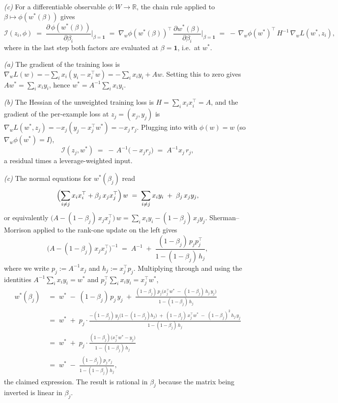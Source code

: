 \documentclass[11pt]{article}
\begin{document}
\begin{solution}[ex:if-derive]
\textit{(c)} For a differentiable observable $\phi:W\to\mathbb{R}$, the chain rule applied to $\beta\mapsto\phi(w^*(\beta))$ gives
\[
  \mathcal{I}(z_i,\phi) \;=\; \frac{\partial\,\phi(w^*(\beta))}{\partial \beta_i}\bigg\rvert_{\beta=\mathbf{1}} \;=\; \nabla_w\phi(w^*(\beta))^\top\,\frac{\partial w^*(\beta)}{\partial \beta_i}\bigg\rvert_{\beta=\mathbf{1}} \;=\; -\,\nabla_w\phi(w^*)^\top\,H^{-1}\,\nabla_w L(w^*,z_i),
\]
where in the last step both factors are evaluated at $\beta = \mathbf{1}$, i.e.\ at $w^*$.

\end{solution}

\begin{solution}[ex:ols-if]

\textit{(a)} The gradient of the training loss is $\nabla_w L(w) = -\sum_i x_i(y_i - x_i^\top w) = -\sum_i x_i y_i + Aw$. Setting this to zero gives $Aw^* = \sum_i x_i y_i$, hence $w^* = A^{-1}\sum_i x_i y_i$.

\textit{(b)} The Hessian of the unweighted training loss is $H = \sum_i x_i x_i^\top = A$, and the gradient of the per-example loss at $z_j = (x_j,y_j)$ is $\nabla_w L(w^*, z_j) = -x_j(y_j - x_j^\top w^*) = -x_j\,r_j$. Plugging into  with $\phi(w) = w$ (so $\nabla_w\phi(w^*) = I$),
\[
  \mathcal{I}(z_j, w^*) \;=\; -\,A^{-1}\bigl(-x_j r_j\bigr) \;=\; A^{-1} x_j\,r_j,
\]
a residual times a leverage-weighted input.

\textit{(c)} The normal equations for $w^*(\beta_j)$ read
\[
  \Bigl(\sum_{i\ne j} x_i x_i^\top + \beta_j\,x_j x_j^\top\Bigr)\,w \;=\; \sum_{i\ne j} x_i y_i \;+\; \beta_j\,x_j y_j,
\]
or equivalently $\bigl(A - (1-\beta_j)\,x_j x_j^\top\bigr)\,w = \sum_i x_i y_i - (1-\beta_j)\,x_j y_j$. Sherman--Morrison applied to the rank-one update on the left gives
\[
  \bigl(A - (1-\beta_j)\,x_j x_j^\top\bigr)^{-1} \;=\; A^{-1} \;+\; \frac{(1-\beta_j)\,p_j p_j^\top}{1 - (1-\beta_j)\,h_j},
\]
where we write $p_j := A^{-1} x_j$ and $h_j := x_j^\top p_j$. Multiplying through and using the identities $A^{-1}\sum_i x_i y_i = w^*$ and $p_j^\top\sum_i x_i y_i = x_j^\top w^*$,
\begin{align*}
  w^*(\beta_j)
  &\;=\; w^* \;-\; (1-\beta_j)\,p_j\,y_j \;+\; \frac{(1-\beta_j)\,p_j\bigl(x_j^\top w^* \;-\; (1-\beta_j)\,h_j\,y_j\bigr)}{1 - (1-\beta_j)\,h_j} \\[3pt]
  &\;=\; w^* \;+\; p_j\cdot\frac{-(1-\beta_j)\,y_j\bigl(1-(1-\beta_j)h_j\bigr) \;+\; (1-\beta_j)\,x_j^\top w^* \;-\; (1-\beta_j)^2\,h_j\,y_j}{1 - (1-\beta_j)\,h_j} \\[3pt]
  &\;=\; w^* \;+\; p_j\cdot\frac{(1-\beta_j)\bigl(x_j^\top w^* - y_j\bigr)}{1 - (1-\beta_j)\,h_j} \\[3pt]
  &\;=\; w^* \;-\; \frac{(1-\beta_j)\,p_j\,r_j}{1 - (1-\beta_j)\,h_j},
\end{align*}
the claimed expression. The result is rational in $\beta_j$ because the matrix being inverted is linear in $\beta_j$.


\end{solution}
\end{document}
